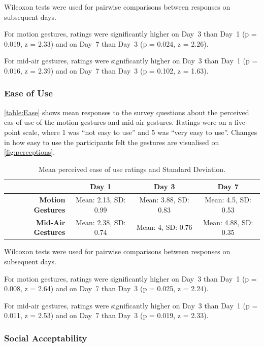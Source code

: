 \documentclass{l4proj}
\begin{document}
Wilcoxon tests were used for pairwise comparisons between responses on subsequent days.

For motion gestures, ratings were significantly higher on Day~3 than Day~1 (p = 0.019, z = 2.33) and on Day~7 than Day~3 (p = 0.024, z = 2.26).

For mid-air gestures, ratings were significantly higher on Day~3 than Day~1 (p = 0.016, z = 2.39) and on Day~7 than Day~3 (p = 0.102, z = 1.63).
\hfill \break






\subsubsection{Ease of Use}

\autoref{table:Ease} shows mean responses to the survey questions about the perceived eas of use of the motion gestures and mid-air gestures. Ratings were on a five-point scale, where 1 was ``not easy to use'' and 5 was ``very easy to use''. Changes in how easy to use the participants felt the gestures are visualised on \autoref{fig:perceptions}. 

\begin{table}[h!]
\centering
\begin{tabular}{r c c c}
                              & \textbf{Day 1} & \textbf{Day 3} & \textbf{Day 7} \\ \toprule
    \textbf{Motion Gestures}  & Mean: 2.13, SD: 0.99    & Mean: 3.88, SD: 0.83    & Mean: 4.5, SD: 0.53\\
    \textbf{Mid-Air Gestures} & Mean: 2.38, SD: 0.74   & Mean: 4, SD: 0.76    & Mean: 4.88, SD: 0.35 \\ \bottomrule
\end{tabular}
\caption{Mean perceived ease of use ratings and Standard Deviation.}
\label{table:Ease}
\end{table}
Wilcoxon tests were used for pairwise comparisons between responses on subsequent days.

For motion gestures, ratings were significantly higher on Day~3 than Day~1 (p = 0.008, z = 2.64) and on Day~7 than Day~3 (p = 0.025, z = 2.24).

For mid-air gestures, ratings were significantly higher on Day~3 than Day~1 (p = 0.011, z = 2.53) and on Day~7 than Day~3 (p = 0.019, z = 2.33).
\hfill \break






\subsubsection{Social Acceptability}
\end{document}
